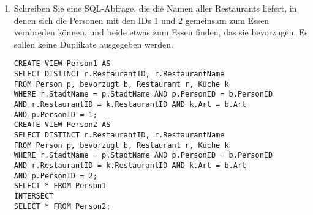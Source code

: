 \documentclass{bschlangaul-aufgabe}
\begin{document}
\begin{enumerate}

\item Schreiben Sie eine SQL-Abfrage, die die Namen aller Restaurants
liefert, in denen sich die Personen mit den IDs 1 und 2 gemeinsam zum
Essen verabreden können, und beide etwas zum Essen finden, das sie
bevorzugen. Es sollen keine Duplikate ausgegeben werden.

\begin{liAntwort}
\begin{verbatim}
CREATE VIEW Person1 AS
SELECT DISTINCT r.RestaurantID, r.RestaurantName
FROM Person p, bevorzugt b, Restaurant r, Küche k
WHERE r.StadtName = p.StadtName AND p.PersonID = b.PersonID
AND r.RestaurantID = k.RestaurantID AND k.Art = b.Art
AND p.PersonID = 1;
CREATE VIEW Person2 AS
SELECT DISTINCT r.RestaurantID, r.RestaurantName
FROM Person p, bevorzugt b, Restaurant r, Küche k
WHERE r.StadtName = p.StadtName AND p.PersonID = b.PersonID
AND r.RestaurantID = k.RestaurantID AND k.Art = b.Art
AND p.PersonID = 2;
SELECT * FROM Person1
INTERSECT
SELECT * FROM Person2;
\end{verbatim}
\end{liAntwort}

\end{enumerate}
\end{document}
